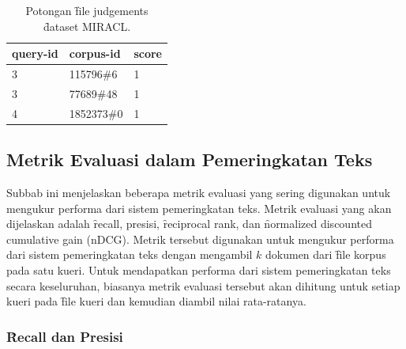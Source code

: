     \begin{table}
        \centering
        \caption{Potongan \f{file} judgements \f{dataset} MIRACL.}
        \label{tab:judgements-file-example}
        \begin{tabular}{|l|l|l|}
            \hline
            \textbf{query-id} & \textbf{corpus-id} & \textbf{score} \\ \hline
            3                 & 115796\#6          & 1              \\ \hline
            3                 & 77689\#48          & 1              \\ \hline
            4                 & 1852373\#0         & 1              \\ \hline
        \end{tabular}
    \end{table}
    


    \subsection{Metrik Evaluasi dalam Pemeringkatan Teks}
    \label{sec:metrik-evaluasi}
    Subbab ini menjelaskan beberapa metrik evaluasi yang sering digunakan untuk mengukur performa dari sistem pemeringkatan teks. Metrik evaluasi yang akan dijelaskan adalah \f{recall}, presisi, \f{reciprocal rank}, dan \f{normalized discounted cumulative gain} (nDCG). Metrik tersebut digunakan untuk mengukur performa dari sistem pemeringkatan teks dengan mengambil $k$ dokumen dari \f{file} korpus pada satu kueri. Untuk mendapatkan performa dari sistem pemeringkatan teks secara keseluruhan, biasanya metrik evaluasi tersebut akan dihitung untuk setiap kueri pada \f{file} kueri dan kemudian diambil nilai rata-ratanya.

    \subsubsection{\f{Recall} dan Presisi}

